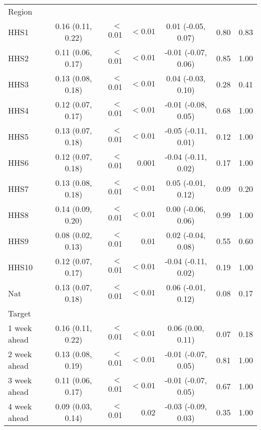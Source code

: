 \documentclass[sagev,times,Review,10pt]{sagej}
\begin{document}
\begin{appendix}
\begin{table}[ht!]
\begin{tabular}{lcrrcrr}
 Region\\    
 \hspace{3mm}	HHS1 &  0.16 (0.11, 0.22) & $<$0.01  &$<0.01$& 0.01 (-0.05, 0.07) &0.80 &0.83\\
 \hspace{3mm}	HHS2 &  0.11 (0.06, 0.17) & $<$0.01  &$<0.01$& -0.01 (-0.07, 0.06) &0.85&1.00\\
 \hspace{3mm}	HHS3 &  0.13 (0.08, 0.18) & $<$0.01  &$<0.01$& 0.04 (-0.03, 0.10) &0.28&0.41\\
 \hspace{3mm}	HHS4 &  0.12 (0.07, 0.17) & $<$0.01  &$<0.01$& -0.01 (-0.08, 0.05) &0.68&1.00\\
 \hspace{3mm}	HHS5 &  0.13 (0.07, 0.18) & $<$0.01  &$<0.01$& -0.05 (-0.11, 0.01) &0.12&1.00\\
 \hspace{3mm}	HHS6 &  0.12 (0.07, 0.18) & $<$0.01  &0.001& -0.04 (-0.11, 0.02) &0.17&1.00\\
 \hspace{3mm}	HHS7 &  0.13 (0.08, 0.18) & $<$0.01  &$<0.01$& 0.05 (-0.01, 0.12) &0.09&0.20\\
 \hspace{3mm}	HHS8 &  0.14 (0.09, 0.20) & $<$0.01  &$<0.01$& 0.00 (-0.06, 0.06) &0.99&1.00\\
 \hspace{3mm}	HHS9 &  0.08 (0.02, 0.13) & $<$0.01  &0.01& 0.02 (-0.04, 0.08) &0.55&0.60\\
 \hspace{3mm}	HHS10 & 0.12 (0.07, 0.17) & $<$0.01  &$<0.01$& -0.04 (-0.11, 0.02) &0.19&1.00\\
 \hspace{3mm}	Nat	 &  0.13 (0.07, 0.18) & $<$0.01  &$<0.01$& 0.06 (-0.01, 0.12) &0.08&0.17\\

 Target\\
 \hspace{3mm}	1 week ahead	&   0.16 (0.11, 0.22) & $<$0.01  &$<0.01$& 0.06 (0.00, 0.11) &0.07&0.18\\
 \hspace{3mm}	2 week ahead	&  0.13 (0.08, 0.19) & $<$0.01  &$<0.01$& -0.01 (-0.07, 0.05) &0.81&1.00\\
 \hspace{3mm}	3 week ahead	&  0.11 (0.06, 0.17) & $<$0.01  &$<0.01$& -0.01 (-0.07, 0.05) &0.67&1.00\\
 \hspace{3mm}	4 week ahead	&  0.09 (0.03, 0.14) & $<$0.01  &0.02& -0.03 (-0.09, 0.03) &0.35&1.00\\
 \hline
\end{tabular}


\end{table}
\end{appendix}
\end{document}
